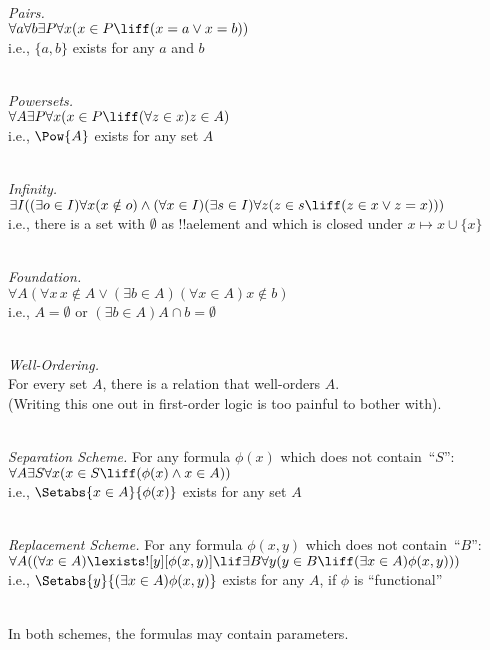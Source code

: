\
\\\emph{Pairs.} 
\\$\forall a \forall b \exists P \forall x (x \in P \liff (x = a \lor x = b))$
\\i.e., $\{a, b\}$ exists for any $a$ and $b$

\
\\\emph{Powersets.}
\\$\forall A \exists P \forall x(x \in P \liff (\forall z \in x)z \in A)$
\\i.e., $\Pow{A}$ exists for any set $A$

\
\\\emph{Infinity.} 	
\\$\exists I((\exists o \in I)\forall x(x \notin o) \land (\forall x \in I)(\exists s \in I)\forall z(z \in s \liff (z \in x \lor z = x)))$
\\i.e., there is a set with $\emptyset$ as !!a{element} and which 
is closed under $x \mapsto x \cup \{x\}$

\
\\\emph{Foundation.}
\\$\forall A(\forall x\, x \notin A \lor (\exists b \in A)(\forall x \in A)x \notin b)$
\\i.e., $A = \emptyset$ or $(\exists b \in A)A\cap b = \emptyset$

\
\\\emph{Well-Ordering.} 
\\For every set $A$, there is a relation that well-orders $A$.
\\(Writing this one out in first-order logic is too painful to bother with).

\
\\\emph{Separation Scheme.} For any formula $\phi(x)$ which does not contain~``$S$'':
\\$\forall A \exists S \forall x(x \in S \liff (\phi(x) \land x \in A))$
\\i.e., $\Setabs{x \in A}{\phi(x)}$ exists for any set $A$

\
\\\emph{Replacement Scheme.} For any formula $\phi(x, y)$ which does not contain~``$B$'':
\\$\forall A((\forall x \in A)\lexists![y][\phi(x,y)] \lif \exists B \forall y (y \in B \liff (\exists x \in A)\phi(x,y)))$
\\i.e., $\Setabs{y}{(\exists x \in A)\phi(x,y)}$ exists for any $A$, if $\phi$ is ``functional''

\
\\In both schemes, the formulas may contain parameters. 

